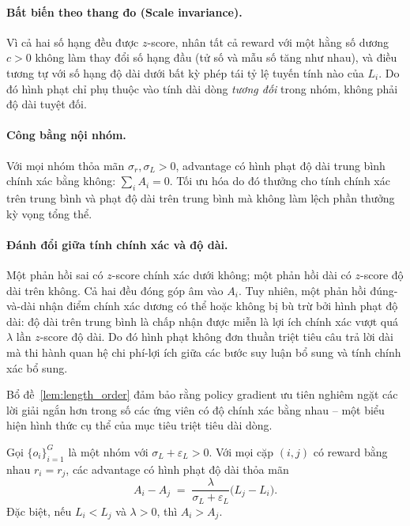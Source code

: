 \documentclass[11pt,a4paper]{article}
\begin{document}
\paragraph{Bất biến theo thang đo (Scale invariance).} Vì cả hai số hạng đều được
\(z\)-score, nhân tất cả reward với một hằng số dương \(c>0\) không làm thay đổi
số hạng đầu (tử số và mẫu số tăng như nhau), và điều tương tự với số hạng độ dài
dưới bất kỳ phép tái tỷ lệ tuyến tính nào của \(L_i\). Do đó hình phạt chỉ
phụ thuộc vào tính dài dòng \emph{tương đối} trong nhóm, không phải độ dài tuyệt đối.

\paragraph{Công bằng nội nhóm.} Với mọi nhóm thỏa mãn
\(\sigma_r,\sigma_L>0\), advantage có hình phạt độ dài trung bình chính xác bằng không:
\(\sum_i A_i = 0\). Tối ưu hóa do đó thưởng cho tính chính xác trên trung bình và
phạt độ dài trên trung bình mà không làm lệch phần thưởng kỳ vọng tổng thể.

\paragraph{Đánh đổi giữa tính chính xác và độ dài.} Một phản hồi sai có
\(z\)-score chính xác dưới không; một phản hồi dài có \(z\)-score độ dài trên
không. Cả hai đều đóng góp âm vào \(A_i\). Tuy nhiên, một phản hồi đúng-và-dài
nhận điểm chính xác dương có thể hoặc không bị bù trừ bởi hình phạt độ dài:
độ dài trên trung bình là chấp nhận được miễn là lợi ích chính xác
vượt quá \(\lambda\) lần \(z\)-score độ dài. Do đó hình phạt không
 đơn thuần triệt tiêu câu trả lời dài mà thi hành quan hệ chi phí-lợi ích giữa
các bước suy luận bổ sung và tính chính xác bổ sung.

Bổ đề~\ref{lem:length_order} đảm bảo rằng policy gradient ưu tiên nghiêm ngặt
các lời giải ngắn hơn trong số các ứng viên có độ chính xác bằng nhau -- một biểu hiện
hình thức cụ thể của mục tiêu triệt tiêu dài dòng.

\begin{lemma}\label{lem:length_order}
Gọi \(\{o_i\}_{i=1}^G\) là một nhóm với \(\sigma_L+\varepsilon_L>0\). Với mọi cặp
\((i,j)\) có reward bằng nhau \(r_i=r_j\), các advantage có hình phạt độ dài thỏa mãn
\[
  A_i - A_j \;=\; \frac{\lambda}{\sigma_L+\varepsilon_L}\bigl(L_j - L_i\bigr).
\]
Đặc biệt, nếu \(L_i<L_j\) và \(\lambda>0\), thì \(A_i>A_j\).
\end{lemma}
\end{document}
